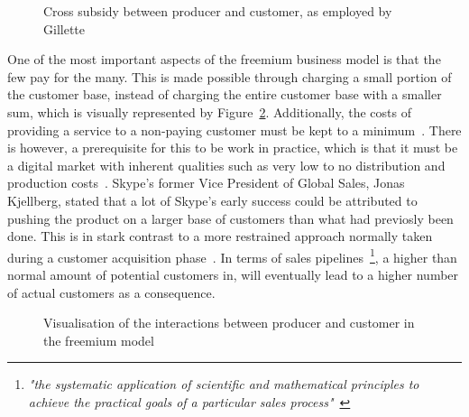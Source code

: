 \begin{figure}
    \centering
    \caption{Cross subsidy between producer and customer, as employed by Gillette~\cite{chrisanderson2008}}
    \label{fig:gillette}
\end{figure}


One of the most important aspects of the freemium business model is that the few pay for the many. This is made possible through charging a small portion of the customer base, instead of charging the entire customer base with a smaller sum, which is visually represented by Figure~\ref{fig:freemium}. Additionally, the costs of providing a service to a non-paying customer must be kept to a minimum~\cite{chrisanderson2008feb}. There is however, a prerequisite for this to be work in practice, which is that it must be a digital market with inherent qualities such as very low to no distribution and production costs~\cite{chrisanderson2008}. Skype's former Vice President of Global Sales, Jonas Kjellberg, stated that a lot of Skype's early success could be attributed to pushing the product on a larger base of customers than what had previosly been done. This is in stark contrast to a more restrained approach normally taken during a customer acquisition phase~\cite{jonaskjellberg2014}. In terms of sales pipelines~\footnote{\textit{"the systematic application of scientific and mathematical principles to achieve the practical goals of a particular sales process"}~\cite{selden1996}}, a higher than normal amount of potential customers in, will eventually lead to a higher number of actual customers as a consequence.

\begin{figure}
    \centering
    \caption{Visualisation of the interactions between producer and customer in the freemium model~\cite{chrisanderson2008}}
    \label{fig:freemium}
\end{figure}

